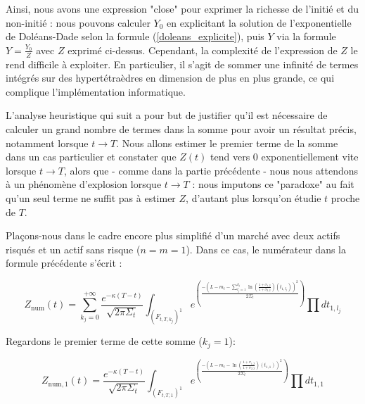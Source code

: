 \documentclass[../finalreport.tex]{subfiles}
\begin{document}
\par Ainsi, nous avons une expression "close" pour exprimer la richesse de l'initié et du non-initié : nous pouvons calculer $Y_0$ en explicitant la solution de l'exponentielle de Doléans-Dade selon la formule (\ref{doleans_explicite}), puis $Y$ via la formule $Y = \frac{Y_0}{Z}$ avec $Z$ exprimé ci-dessus. Cependant, la complexité de l'expression de $Z$ le rend difficile à exploiter. En particulier, il s'agit de sommer une infinité de termes intégrés sur des hypertétraèdres en dimension de plus en plus grande, ce qui complique l'implémentation informatique.

\par L'analyse heuristique qui suit a pour but de justifier qu'il est nécessaire de calculer un grand nombre de termes dans la somme pour avoir un résultat précis, notamment lorsque $t \to T$. Nous allons estimer le premier terme de la somme dans un cas particulier et constater que $Z \left( t \right) $ tend vers $0$ exponentiellement vite lorsque $t \to T$, alors que - comme dans la partie précédente - nous nous attendons à un phénomène d'explosion lorsque $t \to T$ : nous imputons ce "paradoxe" au fait qu'un seul terme ne suffit pas à estimer $Z$, d'autant plus lorsqu'on étudie $t$ proche de $T$.

\par Plaçons-nous dans le cadre encore plus simplifié d'un marché avec deux actifs risqués et un actif sans risque ($n = m =1$). Dans ce cas, le numérateur dans la formule précédente s'écrit :

\begin{displaymath}
Z_{\text{num}} \left( t \right) = \sum\limits_{k_j = 0}^{+ \infty} \dfrac{e^{- {\kappa} \left( T - t\right)}}{\sqrt{2 \pi {\Sigma}_t}} {\displaystyle \int_{{\left( F_{t, T, k_j}\right)}^1}} e^{\left( \frac{- \left( L - m_t - \sum\limits_{l_j = 1}^{k_j} \ln \left( \frac{1 + {\sigma}_{1, 2}}{1 + {\sigma}_{2, 2}} \right) \left( t_{1, l_j} \right) \right)^2}{2 {\Sigma}_t} \right)} \prod d t_{1, l_j}
\end{displaymath}

\par Regardons le premier terme de cette somme ($k_j = 1$):

\begin{displaymath}
Z_{\text{num}, 1} \left( t \right) =  \dfrac{e^{- {\kappa} \left( T - t\right)}}{\sqrt{2 \pi {\Sigma}_t}} {\displaystyle \int_{{\left( F_{t, T, 1}\right)}^1}} e^{\left( \frac{- \left( L - m_t - \ln \left( \frac{1 + {\sigma}_{1, 2}}{1 + {\sigma}_{2, 2}} \right) \left( t_{1, 1} \right) \right)^2}{2 {\Sigma}_t} \right)} \prod d t_{1,1}
\end{displaymath}
\end{document}
